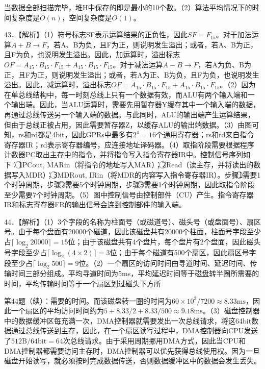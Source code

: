 \documentclass[UTF8,11pt]{ctexart}
\begin{document}
当数据全部扫描完毕，堆H中保存的即是最小的10个数。（2）算法平均情况下的时间复杂度是\(\displaystyle O(n)\)，空间复杂度是\(\displaystyle O(1)\)。


43．【解析】（1）符号标志SF表示运算结果的正负性，因此\(\displaystyle SF=F_{15}\)。对于加法运算\(\displaystyle A+B\to F\)，若A、B为负，且F为正，则说明发生溢出；或者，若A、B为正，且F为负，也说明发生溢出。因此，加运算时，溢出标志\(\displaystyle OF=\overline{A}_{15}\cdot\overline{B}_{15}\cdot F_{15}+A_{15}\cdot B_{15}\cdot\overline{F}_{15}\)。对于减法运算\(\displaystyle A-B\to F\)，若A为负、B为正，且F为正，则说明发生溢出；或者，若A为正、B为负，且F为负，也说明发生溢出。因此，减运算时，溢出标志\(\displaystyle OF=\overline{A}_{15}\cdot B_{15}\cdot F_{15}+A_{15}\cdot\overline{B}_{15}\cdot\overline{F}_{15}\)。（2）因为在单总线结构中，每一时刻总线上只有一个数据有效，而ALU有两个输入端和一个输出端。因此，当ALU运算时，需要先用暂存器Y缓存其中一个输入端的数据，再通过总线传送另一个输入端的数据。与此同时，ALU的输出端产生运算结果，但由于总线正被占用，因此需要暂存器Z，以缓存ALU的输出端数据。（3）由图可知，rs和rd都是4bit，因此GPRs中最多有\(\displaystyle 2^4=16\)个通用寄存器；rs和rd来自指令寄存器IR；rd表示寄存器编号，应连接地址译码器。（4）取指阶段需要根据程序计数器PC取出主存中的指令，并将指令写入指令寄存器IR中。控制信号序列如下：\textcircled{1}PCout, MARin（将指令的地址写入MAR）；\textcircled{2}Read（读主存，并将读出的数据写入MDR）；\textcircled{3}MDRout, IRin（将MDR的内容写入指令寄存器IR）。步骤\textcircled{1}需要1个时钟周期，步骤\textcircled{2}需要5个时钟周期，步骤\textcircled{3}需要1个时钟周期，因此取指令阶段至少需要7个时钟周期。（5）图中控制信号由控制部件（CU）产生。指令寄存器IR和标志寄存器FR的输出信号会连到控制部件的输入端。


44．【解析】（1）3个字段的名称为柱面号（或磁道号）、磁头号（或盘面号）、扇区号。由于每个盘面有20000个磁道，因此该磁盘共有20000个柱面，柱面号字段至少占\(\displaystyle \lceil\log_2 20000\rceil=15\)位；由于该磁盘共有4个盘片，每个盘片有2个盘面，因此磁头号字段至少占\(\displaystyle \lceil\log_2(4\times2)\rceil=3\)位；由于每个磁道有500个扇区，因此扇区号字段至少占\(\displaystyle \lceil\log_2 500\rceil=9\)位。（2）一个扇区的访问时间由寻道时间、延迟时间、传输时间三部分组成。平均寻道时间为5ms，平均延迟时间等于磁盘转半圈所需要的时间，平均传输时间等于一个扇区划过磁头下方所


第44题（续）：需要的时间。而该磁盘转一圈的时间为\(\displaystyle 60\times10^3/7200\approx8.33\mathrm{ms}\)，因此一个扇区的平均访问时间约为\(\displaystyle 5+8.33/2+8.33/500\approx9.18\mathrm{ms}\)。（3）磁盘控制器中的数据缓冲区每充满一次，DMA控制器就需要发出一次总线请求，将这64bit数据通过总线传送到主存，因此，在一个扇区读写过程中，DMA控制器向CPU发送了\(\displaystyle 512\mathrm{B}/64\mathrm{bit}=64\)次总线请求。由于采用周期挪用DMA方式，因此当CPU和DMA控制器都需要访问主存时，DMA控制器可以优先获得总线使用权。因为一旦磁盘开始读写，就必须按时完成数据传送，否则数据缓冲区中的数据会发生丢失。
\end{document}
